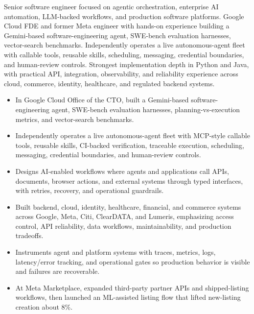 


Senior software engineer focused on agentic orchestration, enterprise AI automation, LLM-backed workflows, and production software platforms. Google Cloud FDE and former Meta engineer with hands-on experience building a Gemini-based software-engineering agent, SWE-bench evaluation harnesses, vector-search benchmarks. Independently operates a live autonomous-agent fleet with callable tools, reusable skills, scheduling, messaging, credential boundaries, and human-review controls. Strongest implementation depth in Python and Java, with practical API, integration, observability, and reliability experience across cloud, commerce, identity, healthcare, and regulated backend systems.
\begin{itemize}
  \item In Google Cloud Office of the CTO, built a Gemini-based software-engineering agent, SWE-bench evaluation harnesses, planning-vs-execution metrics, and vector-search benchmarks.
  \item Independently operates a live autonomous-agent fleet with MCP-style callable tools, reusable skills, CI-backed verification, traceable execution, scheduling, messaging, credential boundaries, and human-review controls.
  \item Designs AI-enabled workflows where agents and applications call APIs, documents, browser actions, and external systems through typed interfaces, with retries, recovery, and operational guardrails.
\end{itemize}
\begin{itemize}
  \item Built backend, cloud, identity, healthcare, financial, and commerce systems across Google, Meta, Citi, ClearDATA, and Lumeris, emphasizing access control, API reliability, data workflows, maintainability, and production tradeoffs.
  \item Instruments agent and platform systems with traces, metrics, logs, latency/error tracking, and operational gates so production behavior is visible and failures are recoverable.
  \item At Meta Marketplace, expanded third-party partner APIs and shipped-listing workflows, then launched an ML-assisted listing flow that lifted new-listing creation about 8\%.
\end{itemize}




